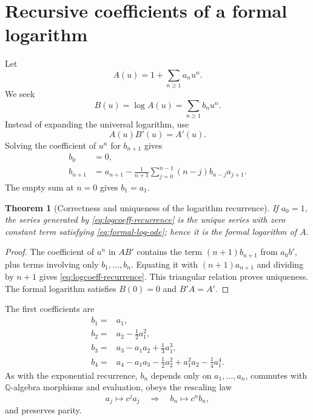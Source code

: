\documentclass[11pt,oneside]{article}
\newtheorem{theorem}{Theorem}[section]
\theoremstyle{definition}
\theoremstyle{remark}
\newcommand{\Q}{\mathbb Q}
\begin{document}
\section{Recursive coefficients of a formal logarithm}
\label{sec:log-coeff}

Let
\begin{equation}
 A(u)=1+\sum_{n\ge1}a_nu^n.
 \label{eq:unit-mass-series}
\end{equation}
We seek
\begin{equation}
 B(u)=\log A(u)=\sum_{n\ge1}b_nu^n.
 \label{eq:formal-log-series}
\end{equation}
Instead of expanding the universal logarithm, use
\begin{equation}
 A(u)B'(u)=A'(u).
 \label{eq:formal-log-ode}
\end{equation}
Solving the coefficient of $u^n$ for $b_{n+1}$ gives
\begin{align}
 b_0&=0,                                                     \label{eq:logcoeff-zero}\\
 b_{n+1}&=a_{n+1}-\frac1{n+1}
 \sum_{j=0}^{n-1}(n-j)b_{n-j}a_{j+1}.                      \label{eq:logcoeff-recurrence}
\end{align}
The empty sum at $n=0$ gives $b_1=a_1$.

\begin{theorem}[Correctness and uniqueness of the logarithm recurrence]
\label{thm:logcoeff-correctness}
If $a_0=1$, the series generated by \eqref{eq:logcoeff-recurrence} is the unique series with
zero constant term satisfying \eqref{eq:formal-log-ode}; hence it is the formal logarithm of
$A$.
\end{theorem}

\begin{proof}
The coefficient of $u^n$ in $AB'$ contains the term $(n+1)b_{n+1}$ from $a_0b'$, plus terms
involving only $b_1,\ldots,b_n$.  Equating it with $(n+1)a_{n+1}$ and dividing by $n+1$
gives \eqref{eq:logcoeff-recurrence}.  This triangular relation proves uniqueness.  The
formal logarithm satisfies $B(0)=0$ and $B'A=A'$.
\end{proof}

The first coefficients are
\begin{align}
 b_1={}&a_1,                                                  \label{eq:b1}\\
 b_2={}&a_2-\frac12a_1^2,                                   \label{eq:b2}\\
 b_3={}&a_3-a_1a_2+\frac13a_1^3,                            \label{eq:b3}\\
 b_4={}&a_4-a_1a_3-\frac12a_2^2+a_1^2a_2-\frac14a_1^4.     \label{eq:b4}
\end{align}
As with the exponential recurrence, $b_n$ depends only on $a_1,\ldots,a_n$, commutes with
$\Q$-algebra morphisms and evaluation, obeys the rescaling law
\begin{equation}
 a_j\mapsto c^ja_j\quad\Longrightarrow\quad b_n\mapsto c^nb_n,
 \label{eq:logcoeff-rescale}
\end{equation}
and preserves parity.
\end{document}
